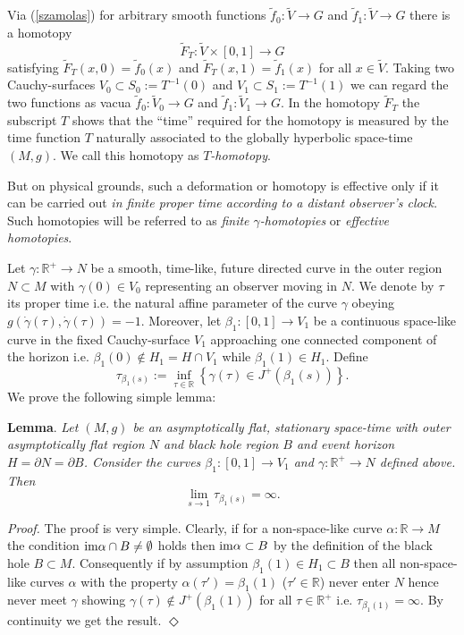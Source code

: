 \documentclass[a4paper,12pt,draft]{article}
\newcommand{\R}{{\mathbb R}}
\begin{document}
Via (\ref{szamolas}) for arbitrary smooth functions
$\tilde{f}_0:\widetilde{V}\rightarrow G$ and 
$\tilde{f}_1:\widetilde{V}\rightarrow G$ there is a homotopy
\begin{equation}
\widetilde{F}_T: \widetilde{V}\times [0,1]\rightarrow G
\label{T-homotopia}
\end{equation}
satisfying $\widetilde{F}_T(x,0)=\tilde{f}_0 (x)$ and
$\widetilde{F}_T(x,1)=\tilde{f}_1 (x)$ for all $x\in\widetilde{V}$.
Taking two Cauchy-surfaces $V_0\subset S_0:=T^{-1}(0)$ and $V_1\subset
S_1:=T^{-1}(1)$ we can regard the two functions as vacua $\tilde{f}_0
:\widetilde{V}_0\rightarrow G$ and $\tilde{f}_1 : 
\widetilde{V}_1\rightarrow G$. In the homotopy $\widetilde{F}_T$ the
subscript $T$ shows that the ``time'' required for the homotopy is
measured by the time function $T$ naturally associated to the globally
hyperbolic space-time $(M,g)$. We call this homotopy as {\it
$T$-homotopy}.

But on physical grounds, such a deformation or homotopy is effective 
only if it can be carried out {\it in finite proper time according to a
distant observer's clock.} Such homotopies will be referred to as
{\it finite $\gamma$-homotopies} or {\it effective homotopies}.

Let $\gamma :\R^+\rightarrow N$ be a smooth, time-like, future directed
curve in the outer region $N\subset M$ with $\gamma (0)\in
V_0$ representing an observer moving in $N$. We denote by $\tau$ its
proper time i.e. the natural affine parameter of the curve
$\gamma$ obeying $g(\dot\gamma (\tau) ,\dot\gamma (\tau ))=-1$. 
Moreover, let $\beta_1: [0,1]\rightarrow V_1$ be a continuous space-like
curve in the fixed Cauchy-surface $V_1$ approaching one connected
component of the horizon i.e. $\beta_1(0)\notin H_1 =H\cap
V_1$ while $\beta_1(1)\in H_1$. Define
\[\tau_{\beta_1(s)}:=\inf\limits_{\tau\in\R}\left\{\gamma (\tau )\in
J^+(\beta_1(s))\right\} .\]
We prove the following simple lemma:
\vspace{0.1in}

{\bf Lemma}. {\it Let $(M,g)$ be an asymptotically flat, stationary
space-time with outer asymptotically flat region $N$ and black hole
region $B$ and event horizon $H=\partial N=\partial B$. Consider the
curves $\beta_1 :[0,1]\rightarrow V_1$ and $\gamma :\R^+\rightarrow N$
defined above. Then}
\[\lim\limits_{s\rightarrow 1}\tau_{\beta_1(s)}=\infty .\]


{\it Proof.} The proof is very simple. Clearly, if for a non-space-like
curve $\alpha :\R\rightarrow M$ the condition ${\rm im}\alpha\cap
B\not=\emptyset$ holds then ${\rm im}\alpha\subset B$ by the definition
of the black hole $B\subset M$. Consequently if by assumption
$\beta_1(1)\in H_1\subset B$ then all non-space-like curves $\alpha$ with
the property $\alpha (\tau ')=\beta_1(1)$ ($\tau '\in\R$) never enter $N$
hence never meet $\gamma$ showing $\gamma (\tau )\notin J^+(\beta_1(1))$
for all $\tau\in\R^+$ i.e. $\tau_{\beta_1(1)}=\infty$. By continuity
we get the result. $\Diamond$
\vspace{0.1in}
  
\end{document}
